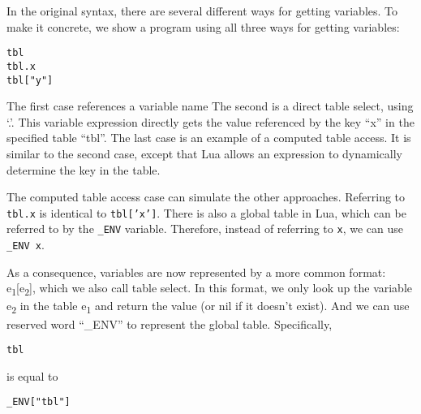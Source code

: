 In the original syntax,
there are several different ways for getting variables.
To make it concrete, we show a program using all three ways for getting variables:

\begin{verbatim}
tbl
tbl.x
tbl["y"]
\end{verbatim}

The first case references a variable name
The second is a direct table select, using `.'.
This variable expression directly gets the value referenced by the key ``x'' in the specified table ``tbl''.
The last case is an example of a computed table access.
It is similar to the second case, except that Lua allows an expression to dynamically determine the key in the table.

The computed table access case can simulate the other approaches.
Referring to {\tt tbl.x} is identical to {\tt tbl['x']}.
There is also a global table in Lua, which can be referred to by the {\tt \_ENV} variable.
Therefore, instead of referring to {\tt x}, we can use {\tt \_ENV x}.

As a consequence, variables are now represented by a more common format: e\textsubscript{1}[e\textsubscript{2}], which we also call table select. In this format, we only look up the variable e\textsubscript{2} in the table e\textsubscript{1} and return the value (or nil if it doesn't exist). And we can use reserved word ``\_ENV'' to represent the global table. Specifically,

\begin{verbatim}
tbl
\end{verbatim}
is equal to
\begin{verbatim}
_ENV["tbl"]
\end{verbatim}

